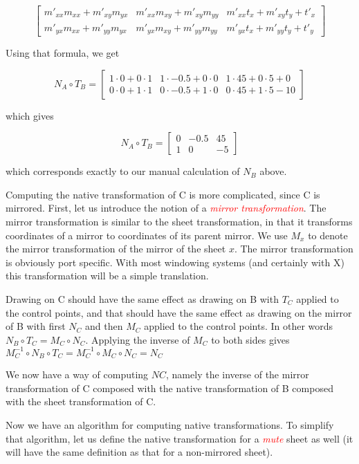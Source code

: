 \documentclass{article}
\newcommand{\gloss}[1]{\textsl{\textcolor{red}{#1}}}
\begin{document}
\[ \left[ \begin{array}{ccc}
{m'}_{xx} m_{xx} + {m'}_{xy} m_{yx} & {m'}_{xx} m_{xy} + {m'}_{xy}
m_{yy} & {m'}_{xx} t_x + {m'}_{xy} t_y + {t'}_x\\
{m'}_{yx} m_{xx} + {m'}_{yy} m_{yx} & {m'}_{yx} m_{xy} + {m'}_{yy}
m_{yy} & {m'}_{yx} t_x + {m'}_{yy} t_y + {t'}_y
\end{array} \right] \]

Using that formula, we get

\[ N_A \circ T_B = \left[ \begin{array}{ccc}
1 \cdot 0 + 0 \cdot 1 & 1 \cdot -0.5 + 0
\cdot 0 & 1 \cdot 45 + 0 \cdot 5 + 0\\
0 \cdot 0 + 1 \cdot 1 & 0 \cdot -0.5 + 1
\cdot 0 & 0 \cdot 45 + 1 \cdot 5 - 10
\end{array} \right] \]

which gives

\[ N_A \circ T_B = \left[ \begin{array}{ccc}
0 & -0.5 & 45\\
1 & 0 & -5
\end{array} \right] \]

which corresponds exactly to our manual calculation of $N_B$ above. 

Computing the native transformation of C is more complicated, since C
is mirrored.  First, let us introduce the notion of a \gloss{mirror
transformation}.  The mirror transformation is similar to the sheet
transformation, in that it transforms coordinates of a mirror to
coordinates of its parent mirror.  We use $M_x$ to denote the mirror
transformation of the mirror of the sheet $x$.  The mirror
transformation is obviously port specific.  With most windowing
systems (and certainly with X) this transformation will be a simple
translation. 

Drawing on C should have the same effect as drawing on B with $T_C$
applied to the control points, and that should have the same effect as
drawing on the mirror of B with first $N_C$ and then $M_C$ applied 
to the control points.  In other words $N_B \circ T_C = M_C \circ
N_C$.  Applying the inverse of $M_C$ to both sides gives $M_C^{-1}
\circ N_B \circ T_C = M_C^{-1} \circ M_C \circ N_C = N_C$ 

We now have a way of computing $NC$, namely the inverse of the mirror
transformation of C composed with the native transformation of B
composed with the sheet transformation of C. 

Now we have an algorithm for computing native transformations.  To
simplify that algorithm, let us define the native transformation for a
\gloss{mute} sheet as well (it will have the same definition as that
for a non-mirrored sheet). 
\end{document}
